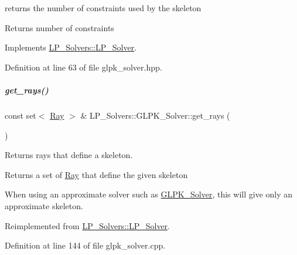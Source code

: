 returns the number of constraints used by the skeleton 

\begin{DoxyReturn}{Returns}
number of constraints 
\end{DoxyReturn}


Implements \hyperlink{group___c_l_s_solvers_a05697a4527b15e26b5e0ae9088a46ed5}{L\+P\+\_\+\+Solvers\+::\+L\+P\+\_\+\+Solver}.



Definition at line 63 of file glpk\+\_\+solver.\+hpp.

\mbox{\label{group___c_l_s_solvers_ae011960777ca5e09d8c2b24c6ff66367}} 
\subparagraph{\texorpdfstring{get\+\_\+rays()}{get\_rays()}}
{\footnotesize\ttfamily const set$<$ \hyperlink{group___c_l_s_solvers_class_l_p___solvers_1_1_ray}{Ray} $>$ \& L\+P\+\_\+\+Solvers\+::\+G\+L\+P\+K\+\_\+\+Solver\+::get\+\_\+rays (\begin{DoxyParamCaption}{ }\end{DoxyParamCaption})\hspace{0.3cm}{\ttfamily [virtual]}}



Returns rays that define a skeleton. 

\begin{DoxyReturn}{Returns}
a set of \hyperlink{group___c_l_s_solvers_class_l_p___solvers_1_1_ray}{Ray} that define the given skeleton
\end{DoxyReturn}
When using an approximate solver such as \hyperlink{group___c_l_s_solvers_class_l_p___solvers_1_1_g_l_p_k___solver}{G\+L\+P\+K\+\_\+\+Solver}, this will give only an approximate skeleton. 

Reimplemented from \hyperlink{group___c_l_s_solvers_a52f7a4068e9d36500d1dcdf35757cd06}{L\+P\+\_\+\+Solvers\+::\+L\+P\+\_\+\+Solver}.



Definition at line 144 of file glpk\+\_\+solver.\+cpp.

